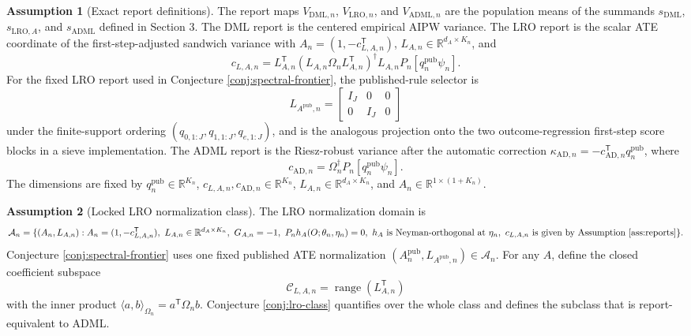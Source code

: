 \documentclass[11pt]{article}
\newcommand{\transpose}{\mathsf{T}}
\newcommand{\R}{\mathbb{R}}
\theoremstyle{definition}
\newtheorem{assumption}{Assumption}
\theoremstyle{plain}
\theoremstyle{remark}
\begin{document}
\begin{assumption}[Exact report definitions]\label{ass:reports}
The report maps \(V_{\mathrm{DML},n}\), \(V_{\mathrm{LRO},n}\), and
\(V_{\mathrm{ADML},n}\) are the population means of the summands
\(s_{\mathrm{DML}}\), \(s_{\mathrm{LRO},A}\), and \(s_{\mathrm{ADML}}\)
defined in Section 3.  The DML report is the centered empirical AIPW variance.
The LRO report is the scalar ATE coordinate of the first-step-adjusted
sandwich variance with \(A_n=(1,-c_{L,A,n}^{\transpose})\),
\(L_{A,n}\in\R^{d_A\times K_n}\), and
\[
c_{L,A,n}
=L_{A,n}^{\transpose}(L_{A,n}\Omega_nL_{A,n}^{\transpose})^\dagger
L_{A,n}P_n[q^{\mathrm{pub}}_n\psi_n].
\]
For the fixed LRO report used in Conjecture
\ref{conj:spectral-frontier}, the published-rule selector is
\[
L_{A^{\mathrm{pub}},n}=
\begin{bmatrix}
I_J&0&0\\
0&I_J&0
\end{bmatrix}
\]
under the finite-support ordering
\((q_{0,1:J},q_{1,1:J},q_{e,1:J})\), and is the analogous projection onto the
two outcome-regression first-step score blocks in a sieve implementation.
The ADML report is the Riesz-robust variance after the automatic correction
\(\kappa_{\mathrm{AD},n}=-c_{\mathrm{AD},n}^{\transpose}q^{\mathrm{pub}}_n\),
where
\[
c_{\mathrm{AD},n}=\Omega_n^\dagger P_n[q^{\mathrm{pub}}_n\psi_n].
\]
The dimensions are fixed by \(q^{\mathrm{pub}}_n\in\R^{K_n}\),
\(c_{L,A,n},c_{\mathrm{AD},n}\in\R^{K_n}\),
\(L_{A,n}\in\R^{d_A\times K_n}\), and
\(A_n\in\R^{1\times(1+K_n)}\).
\end{assumption}

\begin{assumption}[Locked LRO normalization class]\label{ass:lro-class}
The LRO normalization domain is
\[
\mathcal A_n=\{(A_n,L_{A,n}): A_n=(1,-c_{L,A,n}^{\transpose}),\
L_{A,n}\in\R^{d_A\times K_n},\
G_{A,n}=-1,\ P_n h_A(O;\theta_n,\eta_n)=0,\ 
h_A\text{ is Neyman-orthogonal at }\eta_n,\ 
c_{L,A,n}\text{ is given by Assumption \ref{ass:reports}}\}.
\]
Conjecture \ref{conj:spectral-frontier} uses one fixed published ATE
normalization \((A_n^{\mathrm{pub}},L_{A^{\mathrm{pub}},n})\in\mathcal A_n\).
For any \(A\), define the closed coefficient subspace
\[
\mathcal C_{L,A,n}=\operatorname{range}(L_{A,n}^{\transpose})
\]
with the inner product \(\langle a,b\rangle_{\Omega_n}=a^\transpose
\Omega_nb\).  Conjecture
\ref{conj:lro-class} quantifies over the whole class and defines the
subclass that is report-equivalent to ADML.
\end{assumption}
\end{document}
